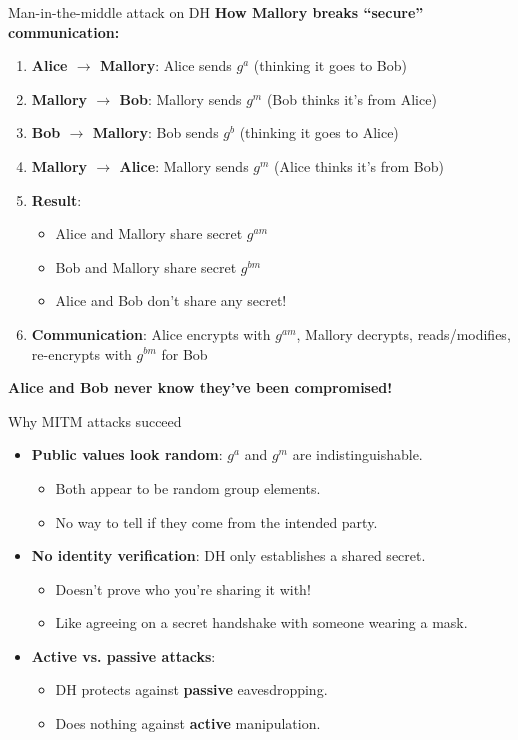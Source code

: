 \ifdefined\PRESENTATION\else\PassOptionsToClass{handout}{beamer}\fi\documentclass[aspectratio=169, lualatex]{beamer}
\begin{document}
\begin{frame}{Man-in-the-middle attack on DH}
	\textbf{How Mallory breaks ``secure'' communication:}
	\vspace{0.2cm}
	\begin{enumerate}[<+->]
		\item \textbf{Alice $\rightarrow$ Mallory}: Alice sends $g^a$ (thinking it goes to Bob)
		\item \textbf{Mallory $\rightarrow$ Bob}: Mallory sends $g^m$ (Bob thinks it's from Alice)
		\item \textbf{Bob $\rightarrow$ Mallory}: Bob sends $g^b$ (thinking it goes to Alice)
		\item \textbf{Mallory $\rightarrow$ Alice}: Mallory sends $g^m$ (Alice thinks it's from Bob)
		\item \textbf{Result}:
		      \begin{itemize}
			      \item Alice and Mallory share secret $g^{am}$
			      \item Bob and Mallory share secret $g^{bm}$
			      \item Alice and Bob don't share any secret!
		      \end{itemize}
		\item \textbf{Communication}: Alice encrypts with $g^{am}$, Mallory decrypts, reads/modifies, re-encrypts with $g^{bm}$ for Bob
	\end{enumerate}
	\vspace{0.2cm}
	\textbf{Alice and Bob never know they've been compromised!}
\end{frame}

\begin{frame}{Why MITM attacks succeed}
	\begin{itemize}[<+->]
		\item \textbf{Public values look random}: $g^a$ and $g^m$ are indistinguishable.
		      \begin{itemize}
			      \item Both appear to be random group elements.
			      \item No way to tell if they come from the intended party.
		      \end{itemize}
		\item \textbf{No identity verification}: DH only establishes a shared secret.
		      \begin{itemize}
			      \item Doesn't prove who you're sharing it with!
			      \item Like agreeing on a secret handshake with someone wearing a mask.
		      \end{itemize}
		\item \textbf{Active vs. passive attacks}:
		      \begin{itemize}
			      \item DH protects against \textbf{passive} eavesdropping.
			      \item Does nothing against \textbf{active} manipulation.
		      \end{itemize}
	\end{itemize}
\end{frame}
\end{document}
